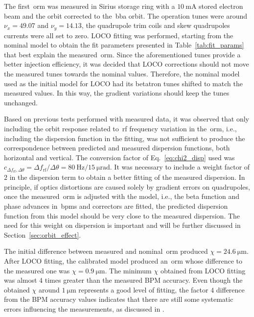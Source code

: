 The first~\gls{orm} was measured in Sirius storage ring with a $\SI{10}{\milli\ampere}$ stored electron beam and the orbit corrected to the~\gls{bba} orbit. The operation tunes were around $\nu_x = 49.07$ and $\nu_y = 14.13$, the quadrupole trim coils and skew quadrupoles currents were all set to zero. LOCO fitting was performed, starting from the nominal model to obtain the fit parameters presented in Table~\ref{tab:fit_params} that best explain the measured~\gls{orm}. Since the aforementioned tunes provide a better injection efficiency, it was decided that LOCO corrections should not move the measured tunes towards the nominal values. Therefore, the nominal model used as the initial model for LOCO had its betatron tunes shifted to match the measured values. In this way, the gradient variations should keep the tunes unchanged.

Based on previous tests performed with measured data, it was observed that only including the orbit response related to~\gls{rf} frequency variation in the~\gls{orm}, i.e., including the dispersion function in the fitting, was not sufficient to produce the correspondence between predicted and measured dispersion functions, both horizontal and vertical. The conversion factor of Eq.~\eqref{eq:chi2_disp} used was $c_{\Delta f_{\mathrm{rf}}, \Delta \theta} = \Delta f_{\mathrm{rf}}/\Delta \theta = \SI{80}{\hertz}/\SI{15}{\micro\radian}$. It was necessary to include a weight factor of $2$ in the dispersion term to obtain a better fitting of the measured dispersion. In principle, if optics distortions are caused solely by gradient errors on quadrupoles, once the measured~\gls{orm} is adjusted with the model, i.e., the beta function and phase advances in~\glspl{bpm} and correctors are fitted, the predicted dispersion function from this model should be very close to the measured dispersion. The need for this weight on dispersion is important and will be further discussed in Section~\ref{sec:orbit_effect}.

The initial difference between measured and nominal~\gls{orm} produced $\chi = \SI{24.6}{\micro\meter}$. After LOCO fitting, the calibrated model produced an~\gls{orm} whose difference to the measured one was $\chi = \SI{0.9}{\micro\meter}$. The minimum $\chi$ obtained from LOCO fitting was almost $4$ times greater than the measured BPM accuracy. Even though the obtained $\chi$ around $\SI{1}{\micro\meter}$ represents a good level of fitting, the factor $4$ difference from the BPM accuracy values indicates that there are still some systematic errors influencing the measurements, as discussed in \cite{safranek1997}.

